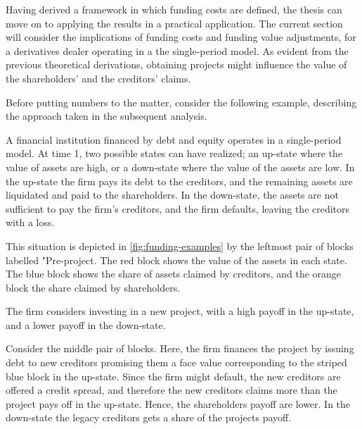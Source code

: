 \documentclass[main.tex]{subfiles}
\begin{document}
    Having derived a framework in which funding costs are defined, 
    the thesis can move on to applying the results in a practical application.
    The current section will consider the implications of funding costs and funding value adjustments,
    for a derivatives dealer operating in a the single-period model.
    As evident from the previous theoretical derivations, 
    obtaining projects might influence the value of the shareholders' and the creditors' claims.

    Before putting numbers to the matter, consider the following example,
    describing the approach taken in the subsequent analysis.

    \begin{example}
    
    A financial institution financed by debt and equity operates in a single-period model.
    At time 1, two possible states can have realized;
    an up-state where the value of assets are high,
    or a down-state where the value of the assets are low.
    In the up-state the firm pays its debt to the creditors,
    and the remaining assets are liquidated and paid to the shareholders.
    In the down-state, the assets are not sufficient to pay the firm's creditors, 
    and the firm defaults, leaving the creditors with a loss. 

    This situation is depicted in \cref{fig:funding-examples} 
    by the leftmost pair of blocks labelled "Pre-project. 
    The \textcolor{wtf-red}{red block} shows the value of the assets in each state.
    The \textcolor{wtf-blue}{blue block} shows the share of assets claimed by creditors,
    and the \textcolor{wtf-orange}{orange block} the share claimed by shareholders.

    The firm considers investing in a new project, with a high payoff in the up-state,
    and a lower payoff in the down-state.

    \newcommand{\striped}[2]{%
        \raisebox{-3pt}{%
        \tikz{%
            \draw%
                node[inner sep=0, outer sep=0] {\textcolor{#1}{#2}}%
                node[
                    fill, 
                    pattern=north east lines, 
                    pattern color=white,
                    inner sep=0, outer sep=0,
                ] {\phantom{#2}};}%
        }%
    }

    Consider the middle pair of blocks.
    Here, the firm finances the project by issuing debt to new creditors
    promising them a face value corresponding to the striped blue block in the up-state.
    Since the firm might default, the new creditors are offered a credit spread,
    and therefore the new creditors claims more than the project pays off in the up-state.
    Hence, the shareholders payoff are lower. 
    In the down-state the legacy creditors gets a share of the projects payoff.


\end{example}
\end{document}

